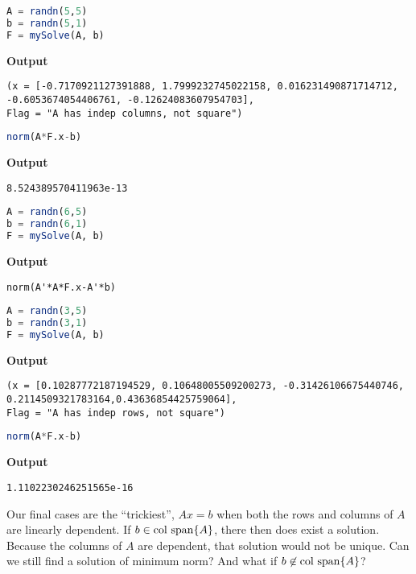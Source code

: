\begin{lstlisting}[language=Julia,style=mystyle]
A = randn(5,5)
b = randn(5,1)
F = mySolve(A, b)
\end{lstlisting}
\textbf{Output} 
\begin{verbatim}
(x = [-0.7170921127391888, 1.7999232745022158, 0.016231490871714712, 
-0.6053674054406761, -0.12624083607954703], 
Flag = "A has indep columns, not square")
\end{verbatim}



\begin{lstlisting}[language=Julia,style=mystyle]
norm(A*F.x-b)
\end{lstlisting}
\textbf{Output} 
\begin{verbatim}
8.524389570411963e-13
\end{verbatim}



\begin{lstlisting}[language=Julia,style=mystyle]
A = randn(6,5)
b = randn(6,1)
F = mySolve(A, b)
\end{lstlisting}
\textbf{Output} 
\begin{verbatim}
norm(A'*A*F.x-A'*b)
\end{verbatim}



\begin{lstlisting}[language=Julia,style=mystyle]
A = randn(3,5)
b = randn(3,1)
F = mySolve(A, b)
\end{lstlisting}
\textbf{Output} 
\begin{verbatim}
(x = [0.10287772187194529, 0.10648005509200273, -0.31426106675440746, 
0.2114509321783164,0.43636854425759064], 
Flag = "A has indep rows, not square")
\end{verbatim}


\begin{lstlisting}[language=Julia,style=mystyle]
norm(A*F.x-b)
\end{lstlisting}
\textbf{Output} 
\begin{verbatim}
1.1102230246251565e-16
\end{verbatim}

Our final cases are the ``trickiest'', $Ax = b$ when both the rows and columns of $A$ are linearly dependent. If $b \in \mathrm{col~span} \{ A \}$, there then does exist a solution. Because the columns of $A$ are dependent, that solution would not be unique. Can we still find a solution of minimum norm? And what if $b \not \in \mathrm{col~span} \{ A \}$?


